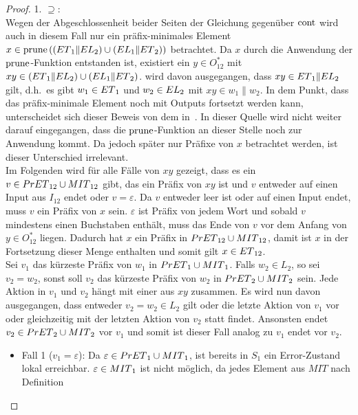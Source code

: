 \begin{proof}
  1. \glqq{}$\supseteq$\grqq{}:\\
  Wegen der Abgeschlossenheit beider Seiten der Gleichung gegenüber $\mathrm{cont}{}$
  wird auch in diesem Fall nur ein präfix-minimales Element $x\in
  \mathrm{prune}{}\left(\left(ET{}_1\|EL{}_2\right)\cup
    \left(EL{}_1\|ET{}_2\right)\right)$ betrachtet. Da $x$ durch
  die Anwendung der $\mathrm{prune}{}$-Funktion entstanden ist, existiert ein $y\in
  O_{12}^*$ mit $xy\in(ET{}_1\|EL{}_2)\cup (EL{}_1\|ET{}_2)$. \OBdA{} wird
  davon ausgegangen, dass
  $xy\in ET{}_1\|EL{}_2$ gilt, d.h.\ es gibt $w_1\in ET{}_1$ und $w_2\in EL{}_2$ mit
  $xy\in w_1\|w_2$. In dem Punkt, dass das präfix-minimale Element noch mit
  Outputs fortsetzt werden kann, unterscheidet sich dieser Beweis von dem
  in~\cite{Schlosser2012BA}. In dieser Quelle wird nicht weiter darauf eingegangen, dass
  die $\mathrm{prune}{}$-Funktion an dieser Stelle noch zur Anwendung kommt. Da jedoch später nur
  Präfixe von $x$ betrachtet werden, ist dieser Unterschied irrelevant.\\
  Im Folgenden wird für alle Fälle von $xy$ gezeigt, dass es ein $v\in
  PrET{}_{12}\cup MIT{}_{12}$ gibt, das ein Präfix von $xy$ ist und $v$
  entweder auf einen Input aus $I_{12}$ endet oder $v = \varepsilon$. Da $v$
  entweder leer ist oder auf einen Input endet, muss $v$ ein Präfix von $x$
  sein. $\varepsilon$ ist Präfix von jedem Wort und sobald $v$ mindestens einen
  Buchstaben enthält, muss das Ende von $v$ vor dem Anfang von $y\in O_{12}^*$
  liegen. Dadurch hat $x$ ein Präfix in $PrET{}_{12}\cup MIT{}_{12}$, damit ist $x$ in
  der Fortsetzung dieser Menge enthalten und somit gilt $x\in ET{}_{12}$.\\
  Sei $v_1$ das kürzeste Präfix von $w_1$ in $PrET{}_1\cup MIT{}_1$. Falls
  $w_2\in L_2$, so sei $v_2=w_2$, sonst soll $v_2$ das kürzeste Präfix von
  $w_2$ in $PrET{}_2\cup MIT{}_2$ sein. Jede Aktion in $v_1$ und $v_2$ hängt mit
  einer aus $xy$ zusammen. Es wird nun davon ausgegangen, dass entweder
  $v_2=w_2\in L_2$ gilt oder die letzte Aktion von $v_1$ vor oder
  gleichzeitig mit der letzten Aktion von $v_2$ statt findet. Ansonsten endet
  $v_2\in PrET{}_2\cup MIT{}_2$ vor $v_1$ und somit ist dieser Fall analog zu $v_1$
  endet vor $v_2$.
  \begin{itemize}
    \item Fall 1 ($v_1=\varepsilon$): Da $\varepsilon\in PrET{}_1\cup
      MIT{}_1$, ist bereits in $S_1$ ein Error-Zustand lokal erreichbar. $\varepsilon\in
      MIT{}_1$ ist nicht möglich, da jedes Element aus $MIT$ nach Definition

\end{itemize}
\end{proof}
